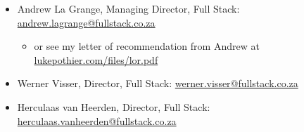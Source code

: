 \documentclass[11pt,a4paper,sans]{moderncv}
\begin{document}
\vspace{3pt}

\begin{itemize}

\item Andrew La Grange, Managing Director, Full Stack: \href{mailto:andrew.lagrange@fullstack.co.za}{andrew.lagrange@fullstack.co.za}
\begin{itemize}
\item or see my letter of recommendation from Andrew at \href{https://lukepothier.com/files/lor.pdf}{lukepothier.com/files/lor.pdf}
\end{itemize}
\item Werner Visser, Director, Full Stack: \href{mailto:werner.visser@fullstack.co.za}{werner.visser@fullstack.co.za}
\item Herculaas van Heerden, Director, Full Stack: \href{mailto:herculaas.vanheerden@fullstack.co.za}{herculaas.vanheerden@fullstack.co.za}

\end{itemize}

\nocite{*}


\end{document}
